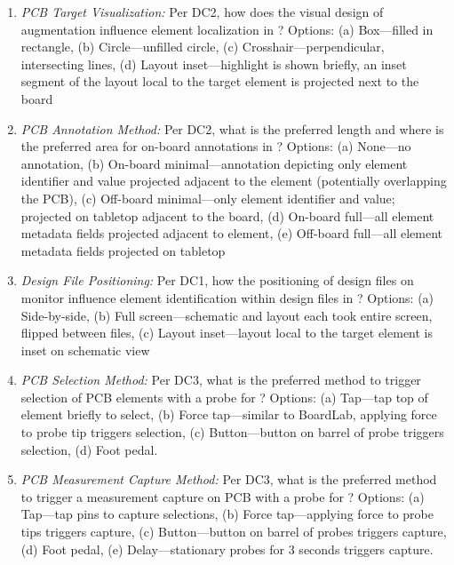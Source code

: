 \documentclass [11pt, proquest] {uwthesis}[2020/02/24]
\begin{document}
\begin{enumerate}
    \item \textit{PCB Target Visualization:} Per DC2, how does the visual design of augmentation influence element localization in \ElemLocOnPCB? Options: (a) Box---filled in rectangle, (b) Circle---unfilled circle, (c) Crosshair---perpendicular, intersecting lines, (d) Layout inset---highlight is shown briefly, an inset segment of the layout local to the target element is projected next to the board
    \item \textit{PCB Annotation Method:} Per DC2, what is the preferred length and where is the preferred area for on-board annotations in \MetaDataOnPCB? Options: (a) None---no annotation, (b) On-board minimal---annotation depicting only element identifier and value projected adjacent to the element (potentially overlapping the PCB), (c) Off-board minimal---only element identifier and value; projected on tabletop adjacent to the board, (d) On-board full---all element metadata fields projected adjacent to element, (e) Off-board full---all element metadata fields projected on tabletop
    \item \textit{Design File Positioning:} Per DC1, how the positioning of design files on monitor influence element identification within design files in \ElemIdOnDesFiles? Options: (a) Side-by-side, (b) Full screen---schematic and layout each took entire screen, flipped between files, (c) Layout inset---layout local to the target element is inset on schematic view
    \item \textit{PCB Selection Method:} Per DC3, what is the preferred method to trigger selection of PCB elements with a probe for \ElemIdOnDesFiles? Options: (a) Tap---tap top of element briefly to select, (b) Force tap---similar to BoardLab, applying force to probe tip triggers selection, (c) Button---button on barrel of probe triggers selection, (d) Foot pedal.
    \item \textit{PCB Measurement Capture Method:} Per DC3, what is the preferred method to trigger a measurement capture on PCB with a probe for \MeasOnDesFiles? Options: (a) Tap---tap pins to capture selections, (b) Force tap---applying force to probe tips triggers capture, (c) Button---button on barrel of probes triggers capture, (d) Foot pedal, (e) Delay---stationary probes for 3 seconds triggers capture.
\end{enumerate}
\end{document}
